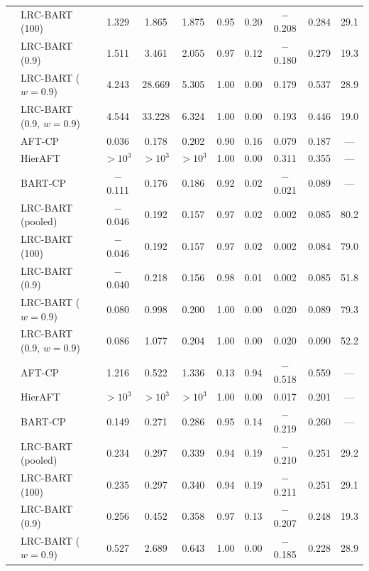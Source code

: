 \documentclass[11pt]{article}
\theoremstyle{definition}
\theoremstyle{plain}
\begin{document}
\begin{center}
\begin{longtable}{llcccccccc}
& LRC-BART (100) & 1.329 & 1.865 & 1.875 & 0.95 & 0.20 & $-$0.208 & 0.284 & 29.1 \\
& LRC-BART (0.9) & 1.511 & 3.461 & 2.055 & 0.97 & 0.12 & $-$0.180 & 0.279 & 19.3 \\
& LRC-BART ($w=0.9$) & 4.243 & 28.669 & 5.305 & 1.00 & 0.00 & 0.179 & 0.537 & 28.9 \\
& LRC-BART (0.9, $w=0.9$) & 4.544 & 33.228 & 6.324 & 1.00 & 0.00 & 0.193 & 0.446 & 19.0 \\
\midrule
{} & AFT-CP & 0.036 & 0.178 & 0.202 & 0.90 & 0.16 & 0.079 & 0.187 & --- \\
& HierAFT & $>\!10^{3}$ & $>\!10^{3}$ & $>\!10^{3}$ & 1.00 & 0.00 & 0.311 & 0.355 & --- \\
& BART-CP & $-$0.111 & 0.176 & 0.186 & 0.92 & 0.02 & $-$0.021 & 0.089 & --- \\
& LRC-BART (pooled) & $-$0.046 & 0.192 & 0.157 & 0.97 & 0.02 & 0.002 & 0.085 & 80.2 \\
& LRC-BART (100) & $-$0.046 & 0.192 & 0.157 & 0.97 & 0.02 & 0.002 & 0.084 & 79.0 \\
& LRC-BART (0.9) & $-$0.040 & 0.218 & 0.156 & 0.98 & 0.01 & 0.002 & 0.085 & 51.8 \\
& LRC-BART ($w=0.9$) & 0.080 & 0.998 & 0.200 & 1.00 & 0.00 & 0.020 & 0.089 & 79.3 \\
& LRC-BART (0.9, $w=0.9$) & 0.086 & 1.077 & 0.204 & 1.00 & 0.00 & 0.020 & 0.090 & 52.2 \\
\midrule
{} & AFT-CP & 1.216 & 0.522 & 1.336 & 0.13 & 0.94 & $-$0.518 & 0.559 & --- \\
& HierAFT & $>\!10^{3}$ & $>\!10^{3}$ & $>\!10^{3}$ & 1.00 & 0.00 & 0.017 & 0.201 & --- \\
& BART-CP & 0.149 & 0.271 & 0.286 & 0.95 & 0.14 & $-$0.219 & 0.260 & --- \\
& LRC-BART (pooled) & 0.234 & 0.297 & 0.339 & 0.94 & 0.19 & $-$0.210 & 0.251 & 29.2 \\
& LRC-BART (100) & 0.235 & 0.297 & 0.340 & 0.94 & 0.19 & $-$0.211 & 0.251 & 29.1 \\
& LRC-BART (0.9) & 0.256 & 0.452 & 0.358 & 0.97 & 0.13 & $-$0.207 & 0.248 & 19.3 \\
& LRC-BART ($w=0.9$) & 0.527 & 2.689 & 0.643 & 1.00 & 0.00 & $-$0.185 & 0.228 & 28.9 \\

\end{longtable}
\end{center}
\end{document}
